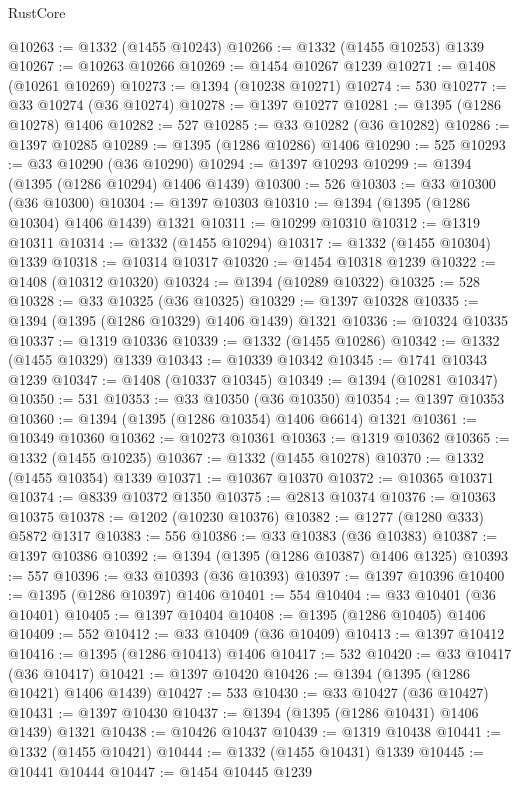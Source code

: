 \begin{lexlean}{RustCore}
\begin{coremodule}
@10263 := @1332 (@1455 @10243)
@10266 := @1332 (@1455 @10253) @1339
@10267 := @10263 @10266
@10269 := @1454 @10267 @1239
@10271 := @1408 (@10261 @10269)
@10273 := @1394 (@10238 @10271)
@10274 := 530
@10277 := @33 @10274 (@36 @10274)
@10278 := @1397 @10277
@10281 := @1395 (@1286 @10278) @1406
@10282 := 527
@10285 := @33 @10282 (@36 @10282)
@10286 := @1397 @10285
@10289 := @1395 (@1286 @10286) @1406
@10290 := 525
@10293 := @33 @10290 (@36 @10290)
@10294 := @1397 @10293
@10299 := @1394 (@1395 (@1286 @10294) @1406 @1439)
@10300 := 526
@10303 := @33 @10300 (@36 @10300)
@10304 := @1397 @10303
@10310 := @1394 (@1395 (@1286 @10304) @1406 @1439) @1321
@10311 := @10299 @10310
@10312 := @1319 @10311
@10314 := @1332 (@1455 @10294)
@10317 := @1332 (@1455 @10304) @1339
@10318 := @10314 @10317
@10320 := @1454 @10318 @1239
@10322 := @1408 (@10312 @10320)
@10324 := @1394 (@10289 @10322)
@10325 := 528
@10328 := @33 @10325 (@36 @10325)
@10329 := @1397 @10328
@10335 := @1394 (@1395 (@1286 @10329) @1406 @1439) @1321
@10336 := @10324 @10335
@10337 := @1319 @10336
@10339 := @1332 (@1455 @10286)
@10342 := @1332 (@1455 @10329) @1339
@10343 := @10339 @10342
@10345 := @1741 @10343 @1239
@10347 := @1408 (@10337 @10345)
@10349 := @1394 (@10281 @10347)
@10350 := 531
@10353 := @33 @10350 (@36 @10350)
@10354 := @1397 @10353
@10360 := @1394 (@1395 (@1286 @10354) @1406 @6614) @1321
@10361 := @10349 @10360
@10362 := @10273 @10361
@10363 := @1319 @10362
@10365 := @1332 (@1455 @10235)
@10367 := @1332 (@1455 @10278)
@10370 := @1332 (@1455 @10354) @1339
@10371 := @10367 @10370
@10372 := @10365 @10371
@10374 := @8339 @10372 @1350
@10375 := @2813 @10374
@10376 := @10363 @10375
@10378 := @1202 (@10230 @10376)
@10382 := @1277 (@1280 @333) @5872 @1317
@10383 := 556
@10386 := @33 @10383 (@36 @10383)
@10387 := @1397 @10386
@10392 := @1394 (@1395 (@1286 @10387) @1406 @1325)
@10393 := 557
@10396 := @33 @10393 (@36 @10393)
@10397 := @1397 @10396
@10400 := @1395 (@1286 @10397) @1406
@10401 := 554
@10404 := @33 @10401 (@36 @10401)
@10405 := @1397 @10404
@10408 := @1395 (@1286 @10405) @1406
@10409 := 552
@10412 := @33 @10409 (@36 @10409)
@10413 := @1397 @10412
@10416 := @1395 (@1286 @10413) @1406
@10417 := 532
@10420 := @33 @10417 (@36 @10417)
@10421 := @1397 @10420
@10426 := @1394 (@1395 (@1286 @10421) @1406 @1439)
@10427 := 533
@10430 := @33 @10427 (@36 @10427)
@10431 := @1397 @10430
@10437 := @1394 (@1395 (@1286 @10431) @1406 @1439) @1321
@10438 := @10426 @10437
@10439 := @1319 @10438
@10441 := @1332 (@1455 @10421)
@10444 := @1332 (@1455 @10431) @1339
@10445 := @10441 @10444
@10447 := @1454 @10445 @1239

\end{coremodule}
\end{lexlean}
